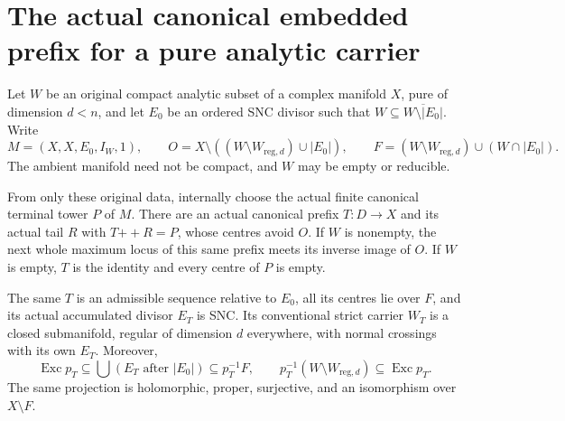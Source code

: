 \section{The actual canonical embedded prefix for a pure analytic carrier}

Let $W$ be an original compact analytic subset of a complex manifold $X$,
pure of dimension $d<n$, and let $E_0$ be an ordered SNC divisor such that
$W\subseteq\overline{W\setminus|E_0|}$.  Write
\[
 M=(X,X,E_0,I_W,1),\qquad
 O=X\setminus((W\setminus W_{\mathrm{reg},d})\cup|E_0|),\qquad
 F=(W\setminus W_{\mathrm{reg},d})\cup(W\cap|E_0|).
\]
The ambient manifold need not be compact, and $W$ may be empty or reducible.

\begin{theorem}
\label{hir:original-pure-boundary-canonical-first-prefix}
\leanok
From only these original data, internally choose the actual finite
canonical terminal tower $P$ of $M$.  There are an actual canonical
prefix $T:D\to X$ and its actual tail $R$ with $T\mathbin{+\!+}R=P$,
whose centres avoid $O$.  If $W$ is nonempty, the next whole maximum
locus of this same prefix meets its inverse image of $O$.  If $W$ is
empty, $T$ is the identity and every centre of $P$ is empty.

The same $T$ is an admissible sequence relative to $E_0$, all its
centres lie over $F$, and its actual accumulated divisor $E_T$ is SNC.
Its conventional strict carrier $W_T$ is a closed submanifold, regular
of dimension $d$ everywhere, with normal crossings with its own $E_T$.
Moreover,
\[
 \operatorname{Exc}p_T\subseteq\bigcup(E_T\text{ after }|E_0|)
       \subseteq p_T^{-1}F,\qquad
 p_T^{-1}(W\setminus W_{\mathrm{reg},d})\subseteq\operatorname{Exc}p_T.
\]
The same projection is holomorphic, proper, surjective, and an
isomorphism over $X\setminus F$.
\end{theorem}
